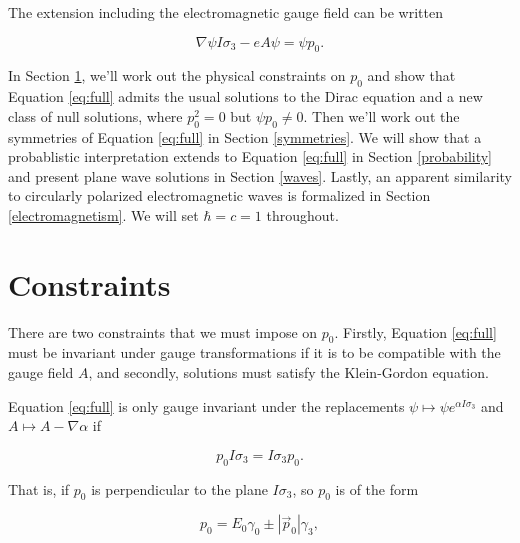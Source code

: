 \documentclass{article}
\begin{document}
  The extension including the electromagnetic gauge field can be written

  \begin{equation}
    \nabla \psi I \sigma_3 - e A \psi = \psi p_0. \label{eq:full}
  \end{equation}

  In Section \ref{constraints}, we'll work out the physical constraints on $p_0$ and show that Equation \ref{eq:full} admits the usual solutions to the Dirac equation and a new class of null solutions, where $p_0^2 = 0$ but $\psi p_0 \not = 0$. Then we'll work out the symmetries of Equation \ref{eq:full} in Section \ref{symmetries}. We will show that a probablistic interpretation extends to Equation \ref{eq:full} in Section \ref{probability} and present plane wave solutions in Section \ref{waves}. Lastly, an apparent similarity to circularly polarized electromagnetic waves is formalized in Section \ref{electromagnetism}. We will set $\hbar = c = 1$ throughout.


  \section{Constraints}\label{constraints}

  There are two constraints that we must impose on $p_0$. Firstly, Equation \ref{eq:full} must be invariant under gauge transformations if it is to be compatible with the gauge field $A$, and secondly, solutions must satisfy the Klein-Gordon equation.

  Equation \ref{eq:full} is only gauge invariant under the replacements $\psi \mapsto \psi e^{\alpha I \sigma_3}$ and $A \mapsto A - \nabla \alpha$ if 

  \begin{equation}
    p_0 I\sigma_3 = I \sigma_3 p_0. \label{momentum-perp-spin}
  \end{equation} 

  That is, if $p_0$ is perpendicular to the plane $I \sigma_3$, so $p_0$ is of the form

  \begin{equation}
    p_0 = E_0 \gamma_0 \pm |\vec p_0| \gamma_3,\label{eq:p_0}
  \end{equation} 
\end{document}
